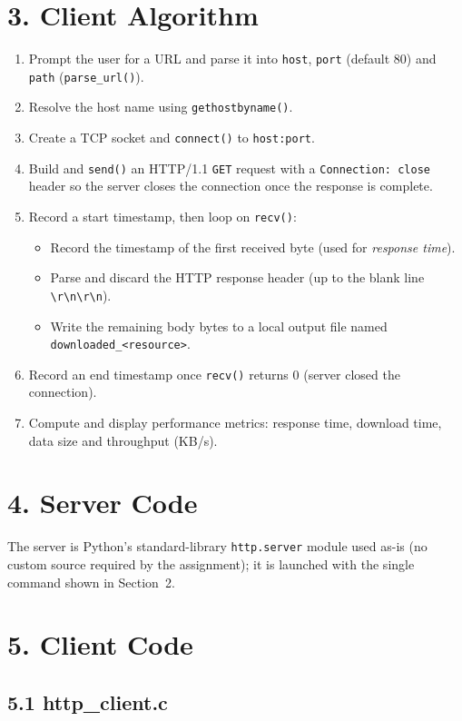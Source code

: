 \documentclass[11pt]{article}
\begin{document}
\section*{3. Client Algorithm}
\begin{enumerate}
  \item Prompt the user for a URL and parse it into \texttt{host}, \texttt{port} (default 80) and
        \texttt{path} (\texttt{parse\_url()}).
  \item Resolve the host name using \texttt{gethostbyname()}.
  \item Create a TCP socket and \texttt{connect()} to \texttt{host:port}.
  \item Build and \texttt{send()} an HTTP/1.1 \texttt{GET} request with a \texttt{Connection: close}
        header so the server closes the connection once the response is complete.
  \item Record a start timestamp, then loop on \texttt{recv()}:
  \begin{itemize}
    \item Record the timestamp of the first received byte (used for \emph{response time}).
    \item Parse and discard the HTTP response header (up to the blank line \texttt{\textbackslash r\textbackslash n\textbackslash r\textbackslash n}).
    \item Write the remaining body bytes to a local output file named
          \texttt{downloaded\_<resource>}.
  \end{itemize}
  \item Record an end timestamp once \texttt{recv()} returns 0 (server closed the connection).
  \item Compute and display performance metrics: response time, download time, data size and
        throughput (KB/s).
\end{enumerate}

\section*{4. Server Code}
The server is Python's standard-library \texttt{http.server} module used as-is (no custom source
required by the assignment); it is launched with the single command shown in Section~2.

\section*{5. Client Code}
\subsection*{5.1 http\_client.c}

\end{document}

